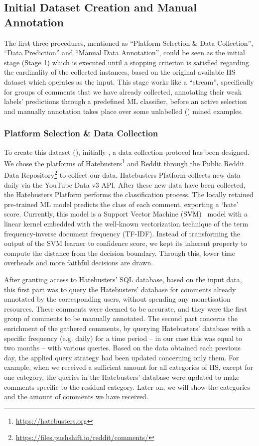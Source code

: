 \documentclass{article}
\begin{document}
\subsection{Initial Dataset Creation and Manual Annotation}
The first three procedures, mentioned as ``Platform Selection \& Data Collection'', ``Data Prediction'' and ``Manual Data Annotation'', could be seen as the initial stage (Stage 1) which is executed until a stopping criterion is satisfied regarding the cardinality of the collected instances, based on the original available HS dataset which operates as the input. This stage works like a ``stream'', specifically for groups of comments that we have already collected, annotating their weak labels' predictions through a predefined ML classifier, before an active selection and manually annotation takes place over some unlabelled () mined examples.

\subsubsection{Platform Selection \& Data Collection}
To create this dataset (), initially , a data collection protocol has been designed. We chose the platforms of Hatebusters\footnote{\url{https://hatebusters.org}} and Reddit through the Public Reddit Data Repository\footnote{\url{https://files.pushshift.io/reddit/comments/}} to collect our data. Hatebusters Platform collects new data daily via the YouTube Data v3 API. After these new data have been collected, the Hatebusters Platform performs the classification process. The locally retained pre-trained ML model predicts the class of each comment, exporting a `hate' score. Currently, this model is a Support Vector Machine (SVM)~\cite{SVM} model with a linear kernel embedded with the well-known vectorization technique of the term frequency-inverse document frequency (TF-IDF). Instead of transforming the output of the SVM learner to confidence score, we kept its inherent property to compute the distance from the decision boundary. Through this, lower time overheads and more faithful decisions are drawn.

After granting access to Hatebusters' SQL database, based on the input data, this first part was to query the Hatebusters' database for comments already annotated by the corresponding users, without spending any monetisation resources. These comments were deemed to be accurate, and they were the first group of comments to be manually annotated. The second part concerns the enrichment of the gathered comments, by querying Hatebusters' database with a specific frequency (e.g. daily) for a time period -- in our case this was equal to two months -- with various queries. Based on the data obtained each previous day, the applied query strategy had been updated concerning only them. For example, when we received a sufficient amount for all categories of HS, except for one category, the queries in the Hatebusters' database were updated to make comments specific to the residual category. Later on, we will show the categories and the amount of comments we have received.
\end{document}

